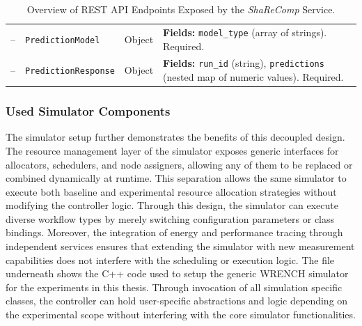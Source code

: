 \begin{table}[H]
{\begin{tabular}{
            p{0.8cm}
            p{5.3cm}
            >{\centering\arraybackslash}p{2cm}
            p{9cm}
            }
            --          & \texttt{PredictionModel}        & Object          &
            \textbf{Fields:} \texttt{model\_type} (array of strings). Required.                                                        \\

            --          & \texttt{PredictionResponse}     & Object          &
            \textbf{Fields:} \texttt{run\_id} (string), \texttt{predictions} (nested map of numeric values). Required.                 \\


            \bottomrule
        \end{tabular}
    }
    \small
    \caption{Overview of REST API Endpoints Exposed by the \textit{ShaReComp} Service.}
    \label{tab:api_endpoints}
\end{table}

\subsubsection{Used Simulator Components}
\label{sec:simulator_setup}
The simulator setup further demonstrates the benefits of this decoupled design. The resource management layer of the simulator exposes generic interfaces for allocators, schedulers, and node assigners, allowing any of them to be replaced or combined dynamically at runtime. This separation allows the same simulator to execute both baseline and experimental resource allocation strategies without modifying the controller logic. Through this design, the simulator can execute diverse workflow types by merely switching configuration parameters or class bindings. Moreover, the integration of energy and performance tracing through independent services ensures that extending the simulator with new measurement capabilities does not interfere with the scheduling or execution logic. The file underneath shows the C++ code used to setup the generic WRENCH simulator for the experiments in this thesis. Through invocation of all simulation specific classes, the controller can hold user-specific abstractions and logic depending on the experimental scope without interfering with the core simulator functionalities.
\newline
